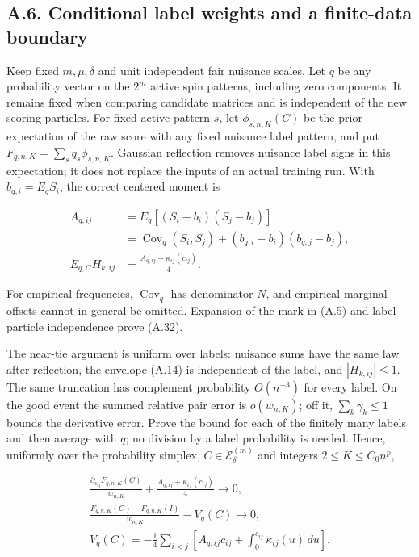 \documentclass{article}
\begin{document}
\subsection*{A.6. Conditional label weights and a finite-data
boundary}\label{a.6.-conditional-label-weights-and-a-finite-data-boundary}

Keep fixed \(m,\mu,\delta\) and unit independent fair nuisance scales.
Let \(q\) be any probability vector on the \(2^m\) active spin patterns,
including zero components. It remains fixed when comparing candidate
matrices and is independent of the new scoring particles. For fixed
active pattern \(s\), let \(\phi_{s,n,K}(C)\) be the prior expectation
of the raw score with any fixed nuisance label pattern, and put
\(F_{q,n,K}=\sum_s q_s\phi_{s,n,K}\). Gaussian reflection removes
nuisance label signs in this expectation; it does not replace the inputs
of an actual training run. With \(b_{q,i}=E_qS_i\), the correct centered
moment is

\[
\begin{aligned}
A_{q,ij}&=E_q[(S_i-b_i)(S_j-b_j)]\\
&=\operatorname{Cov}_q(S_i,S_j)+(b_{q,i}-b_i)(b_{q,j}-b_j),\\
E_{q,C}H_{k,ij}&=\frac{A_{q,ij}+\kappa_{ij}(c_{ij})}{4}.
\end{aligned}
\tag{A.32}
\]

For empirical frequencies, \(\operatorname{Cov}_q\) has denominator
\(N\), and empirical marginal offsets cannot in general be omitted.
Expansion of the mark in (A.5) and label--particle independence prove
(A.32).

The near-tie argument is uniform over labels: nuisance sums have the
same law after reflection, the envelope (A.14) is independent of the
label, and \(|H_{k,ij}|\le1\). The same truncation has complement
probability \(O(n^{-3})\) for every label. On the good event the summed
relative pair error is \(o(w_{n,K})\); off it, \(\sum_k\gamma_k\le1\)
bounds the derivative error. Prove the bound for each of the finitely
many labels and then average with \(q\); no division by a label
probability is needed. Hence, uniformly over the probability simplex,
\(C\in\mathcal E_\delta^{(m)}\) and integers \(2\le K\le C_0n^p\),

\[
\begin{gathered}
\frac{\partial_{c_{ij}}F_{q,n,K}(C)}{w_{n,K}}
+\frac{A_{q,ij}+\kappa_{ij}(c_{ij})}{4}\longrightarrow0,\\
\frac{F_{q,n,K}(C)-F_{q,n,K}(I)}{w_{n,K}}-V_q(C)\longrightarrow0,\\
V_q(C)=-\frac14\sum_{i<j}
\left[A_{q,ij}c_{ij}+\int_0^{c_{ij}}\kappa_{ij}(u)\,du\right].
\end{gathered}
\tag{A.33}
\]
\end{document}
